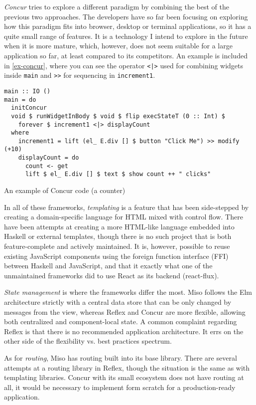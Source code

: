 \documentclass[english,odsaz]{fitthesis}
\begin{document}
\emph{Concur} \cite{concur} tries to explore a different paradigm by combining the best
of the previous two approaches. The developers have so far been focusing on
exploring how this paradigm fits into browser, desktop or terminal applications,
so it has a quite small range of features. It is a technology I intend to
explore in the future when it is more mature, which, however, does not seem
suitable for a large application so far, at least compared to its
competitors. An example is included in \ref{ex-concur}, where you can see the
operator \texttt{<|>} used for combining widgets inside \texttt{main} and \texttt{>>} for sequencing in
\texttt{increment1}.

\begin{listing}[htbp]
\begin{verbatim}
main :: IO ()
main = do
  initConcur
  void $ runWidgetInBody $ void $ flip execStateT (0 :: Int) $
    forever $ increment1 <|> displayCount
  where
    increment1 = lift (el_ E.div [] $ button "Click Me") >> modify (+10)
    displayCount = do
      count <- get
      lift $ el_ E.div [] $ text $ show count ++ " clicks"
\end{verbatim}
\caption{An example of Concur code (a counter) \label{ex-concur}}
\end{listing}

In all of these frameworks, \emph{templating} is a feature that has been side-stepped
by creating a domain-specific language for HTML mixed with control flow. There
have been attempts at creating a more HTML-like language embedded into Haskell
or external templates, though there is no such project that is both
feature-complete and actively maintained. It is, however, possible to reuse
existing JavaScript components using the foreign function interface (FFI)
between Haskell and JavaScript, and that it exactly what one of the unmaintained
frameworks did to use React as its backend (react-flux).

\emph{State management} is where the frameworks differ the most. Miso follows the Elm
architecture strictly with a central data store that can be only changed by
messages from the view, whereas Reflex and Concur are more flexible, allowing
both centralized and component-local state. A common complaint regarding Reflex
is that there is no recommended application architecture. It errs on the other
side of the flexibility vs. best practices spectrum.

As for \emph{routing}, Miso has routing built into its base library. There are several
attempts at a routing library in Reflex, though the situation is the same as
with templating libraries. Concur with its small ecosystem does not have routing
at all, it would be necessary to implement form scratch for a production-ready
application.
\end{document}
